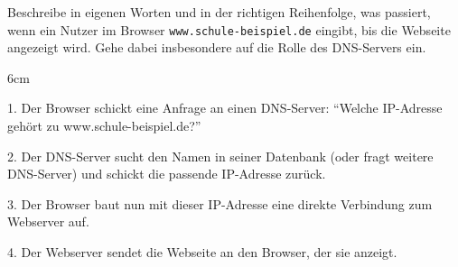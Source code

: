 \question[3]
Beschreibe in eigenen Worten und in der richtigen Reihenfolge, was passiert,
wenn ein Nutzer im Browser \texttt{www.schule-beispiel.de} eingibt, 
bis die Webseite angezeigt wird. Gehe dabei insbesondere auf die Rolle des DNS-Servers ein.

\begin{solutionbox}{6cm}

1. Der Browser schickt eine Anfrage an einen DNS-Server:
   \enquote{Welche IP-Adresse gehört zu www.schule-beispiel.de?}

2. Der DNS-Server sucht den Namen in seiner Datenbank (oder
   fragt weitere DNS-Server) und schickt die passende
   IP-Adresse zurück.

3. Der Browser baut nun mit dieser IP-Adresse eine direkte
   Verbindung zum Webserver auf.

4. Der Webserver sendet die Webseite an den Browser, der sie
   anzeigt.

\end{solutionbox}
